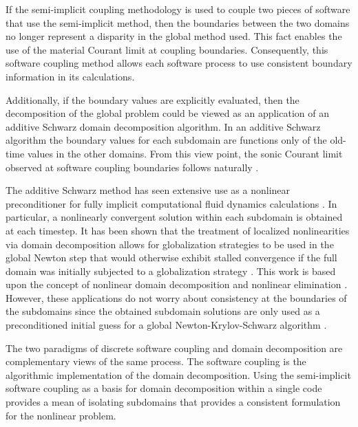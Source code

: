 If the semi-implicit coupling methodology is used to couple two pieces of software that use the semi-implicit method, then the boundaries between the two domains no longer represent a disparity in the global method used.
This fact enables the use of the material Courant limit at coupling boundaries.
Consequently, this software coupling method allows each software process to use consistent boundary information in its calculations.

Additionally, if the boundary values are explicitly evaluated, then the decomposition of the global problem could be viewed as an application of an additive Schwarz domain decomposition algorithm.
In an additive Schwarz algorithm the boundary values for each subdomain are functions only of the old-time values in the other domains.
From this view point, the sonic Courant limit observed at software coupling boundaries follows naturally \cite{Aumiller2001}.

The additive Schwarz method has seen extensive use as a nonlinear preconditioner for fully implicit computational fluid dynamics calculations \cite{Cai2009, Cai2002}.
In particular, a nonlinearly convergent solution within each subdomain is obtained at each timestep.
It has been shown that the treatment of localized nonlinearities via domain decomposition allows for globalization strategies to be used in the global Newton step that would otherwise exhibit stalled convergence if the full domain was initially subjected to a globalization strategy \cite{Cai2011}.
This work is based upon the concept of nonlinear domain decomposition and nonlinear elimination \cite{Lanzkron1996, Dryja1997}.
However, these applications do not worry about consistency at the boundaries of the subdomains since the obtained subdomain solutions are only used as a preconditioned initial guess for a global Newton-Krylov-Schwarz algorithm \cite{Chan1984}.

The two paradigms of discrete software coupling and domain decomposition are complementary views of the same process.
The software coupling is the algorithmic implementation of the domain decomposition.
Using the semi-implicit software coupling as a basis for domain decomposition within a single code provides a mean of isolating subdomains that provides a consistent formulation for the nonlinear problem.